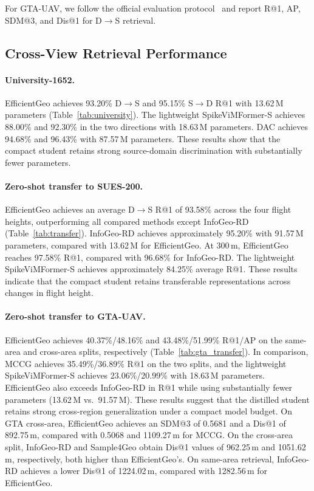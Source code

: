 For GTA-UAV, we follow the official evaluation
protocol~\cite{ji2025game4loc} and report R@1, AP,
SDM@3, and Dis@1 for D$\rightarrow$S retrieval.
\subsection{Cross-View Retrieval Performance}
\label{sec:retrieval_performance}



\paragraph{University-1652.}
EfficientGeo achieves 93.20\% D$\rightarrow$S and 95.15\% S$\rightarrow$D R@1 with 13.62\,M parameters (Table~\ref{tab:university}). The lightweight SpikeViMFormer-S achieves 88.00\% and 92.30\% in the two directions with 18.63\,M parameters. DAC achieves 94.68\% and 96.43\% with 87.57\,M parameters. These results show that the compact student retains strong source-domain discrimination with substantially fewer parameters.

\paragraph{Zero-shot transfer to SUES-200.}
EfficientGeo achieves an average D$\rightarrow$S R@1 of 93.58\% across the four flight heights, outperforming all compared methods except InfoGeo-RD (Table~\ref{tab:transfer}). InfoGeo-RD achieves approximately 95.20\% with 91.57\,M parameters, compared with 13.62\,M for EfficientGeo. At 300\,m, EfficientGeo reaches 97.58\% R@1, compared with 96.68\% for InfoGeo-RD. The lightweight SpikeViMFormer-S achieves approximately 84.25\% average R@1. These results indicate that the compact student retains transferable representations across changes in flight height.

\paragraph{Zero-shot transfer to GTA-UAV.}
EfficientGeo achieves 40.37\%/48.16\% and 43.48\%/51.99\% R@1/AP on the same-area and cross-area splits, respectively (Table~\ref{tab:gta_transfer}). In comparison, MCCG achieves 35.49\%/36.89\% R@1 on the two splits, and the lightweight SpikeViMFormer-S achieves 23.06\%/20.99\% with 18.63\,M parameters. EfficientGeo also exceeds InfoGeo-RD in R@1 while using substantially fewer parameters (13.62\,M vs.\ 91.57\,M). These results suggest that the distilled student retains strong cross-region generalization under a compact model budget. On GTA cross-area, EfficientGeo achieves an SDM@3 of 0.5681 and a Dis@1 of 892.75\,m, compared with 0.5068 and 1109.27\,m for MCCG. On the cross-area split, InfoGeo-RD and Sample4Geo obtain Dis@1 values of 962.25\,m and 1051.62\,m, respectively, both higher than EfficientGeo's. On same-area retrieval, InfoGeo-RD achieves a lower Dis@1 of 1224.02\,m, compared with 1282.56\,m for EfficientGeo.


